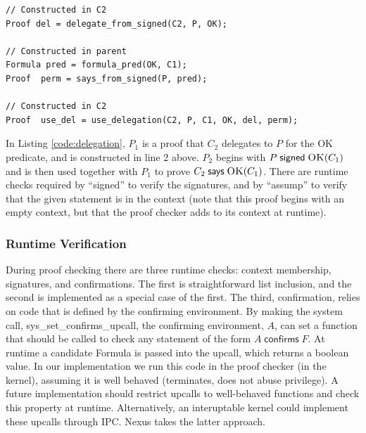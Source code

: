 \documentclass[10pt]{article}
\newcommand{\sign}[2]{\ensuremath{#1\;\textsf{signed}\;#2}}
\newcommand{\says}[2]{\ensuremath{#1\;\textsf{says}\;#2}}
\newcommand{\confirms}[2]{\ensuremath{#1\;\textsf{confirms}\;#2}}
\newcommand{\pred}[2]{\ensuremath{\textsc{#1}(#2)}}
\begin{document}
\begin{lstlisting}
// Constructed in C2
Proof del = delegate_from_signed(C2, P, OK);  

// Constructed in parent
Formula pred = formula_pred(OK, C1);
Proof  perm = says_from_signed(P, pred);

// Constructed in C2
Proof  use_del = use_delegation(C2, P, C1, OK, del, perm);
\end{lstlisting}
In Listing \ref{code:delegation}, $P_1$ is a proof that $C_2$ delegates to $P$ for the OK predicate, and is constructed in line 2 above.  $P_2$ begins with $\sign{P}{\pred{OK}{C_1}}$ and is then used together with $P_1$ to prove $\says{C_2}{\pred{OK}{C_1}}$.  There are runtime checks required by ``signed'' to verify the signatures, and by ``assump'' to verify that the given statement is in the context (note that this proof begins with an empty context, but that the proof checker adds to its context at runtime).  

\subsubsection{Runtime Verification}
During proof checking there are three runtime checks: context membership, signatures, and confirmations.  The first is straightforward list inclusion, and the second is implemented as a special case of the first.  The third, confirmation, relies on code that is defined by the confirming environment.  By making the system call, \textsf{sys\_set\_confirms\_upcall}, the confirming environment, $A$, can set a function that should be called to check any statement of the form $\confirms{A}{F}$.  At runtime a candidate Formula is passed into the upcall, which returns a boolean value.  In our implementation we run this code in the proof checker (in the kernel), assuming it is well behaved (terminates, does not abuse privilege).  A future implementation should restrict upcalls to well-behaved functions and check this property at runtime. Alternatively, an interuptable kernel could implement these upcalls through IPC. Nexus takes the latter approach.
\end{document}
